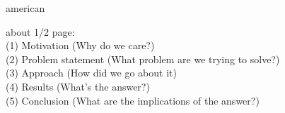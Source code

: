 \begin{otherlanguage*}{american}
\begin{tcolorbox}[title=TODO]
about 1/2 page:   \\
(1) Motivation (Why do we care?)   \\
(2) Problem statement (What problem are we trying to solve?)   \\
(3) Approach (How did we go about it)   \\
(4) Results (What's the answer?)   \\
(5) Conclusion (What are the implications of the answer?)\\
\end{tcolorbox}


\end{otherlanguage*}




